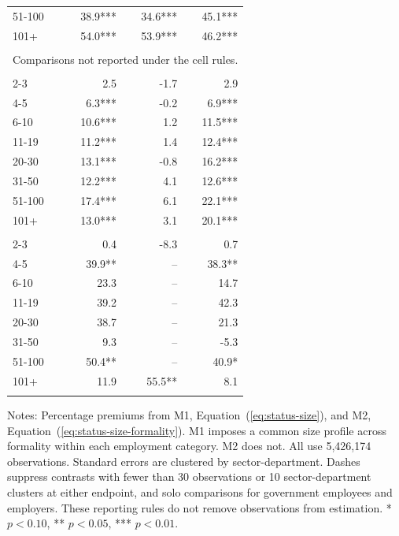 \begin{longtable}{lrrr}
51-100 & 38.9*** & 34.6*** & 45.1*** \\*
101+ & 54.0*** & 53.9*** & 46.2*** \\
\addlinespace
\multicolumn{4}{l}{\textit{Employers}}\\*
\multicolumn{4}{l}{Comparisons not reported under the cell rules.}\\
\addlinespace
\multicolumn{4}{l}{\textit{Day laborers}}\\*
2-3 & 2.5 & -1.7 & 2.9 \\*
4-5 & 6.3*** & -0.2 & 6.9*** \\*
6-10 & 10.6*** & 1.2 & 11.5*** \\*
11-19 & 11.2*** & 1.4 & 12.4*** \\*
20-30 & 13.1*** & -0.8 & 16.2*** \\*
31-50 & 12.2*** & 4.1 & 12.6*** \\*
51-100 & 17.4*** & 6.1 & 22.1*** \\*
101+ & 13.0*** & 3.1 & 20.1*** \\
\addlinespace
\multicolumn{4}{l}{\textit{Other workers}}\\*
2-3 & 0.4 & -8.3 & 0.7 \\*
4-5 & 39.9** & -- & 38.3** \\*
6-10 & 23.3 & -- & 14.7 \\*
11-19 & 39.2 & -- & 42.3 \\*
20-30 & 38.7 & -- & 21.3 \\*
31-50 & 9.3 & -- & -5.3 \\*
51-100 & 50.4** & -- & 40.9* \\*
101+ & 11.9 & 55.5** & 8.1 \\
\addlinespace
\end{longtable}
\noindent\footnotesize Notes: Percentage premiums from M1, Equation~(\ref{eq:status-size}), and M2, Equation~(\ref{eq:status-size-formality}). M1 imposes a common size profile across formality within each employment category. M2 does not. All use 5,426,174 observations. Standard errors are clustered by sector-department. Dashes suppress contrasts with fewer than 30 observations or 10 sector-department clusters at either endpoint, and solo comparisons for government employees and employers. These reporting rules do not remove observations from estimation. * $p<0.10$, ** $p<0.05$, *** $p<0.01$.
\endgroup

